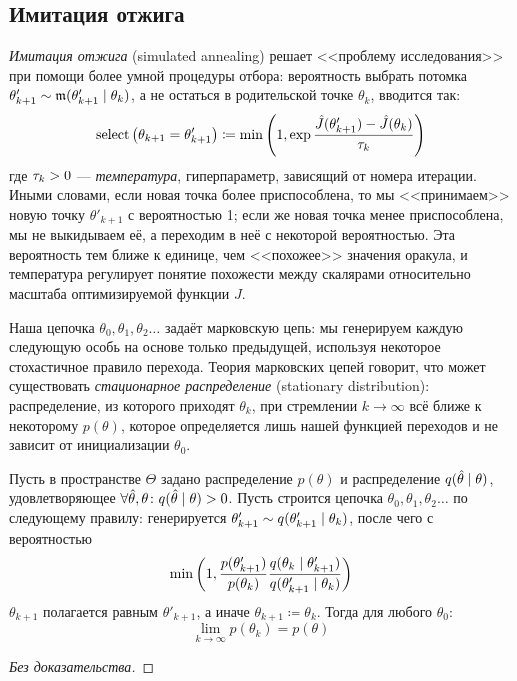 \subsection{Имитация отжига}

\emph{Имитация отжига} (simulated annealing) решает <<проблему исследования>> при помощи более умной процедуры отбора: вероятность выбрать потомка $\theta'_{k+1} \HM \sim \mut(\theta'_{k+1} \HM\mid \theta_k)$, а не остаться в родительской точке $\theta_k$, вводится так:
$$\mathrm{select} \left( \theta_{k+1} = \theta'_{k+1} \right) \coloneqq \min \left(1, \exp{\frac{\hat{J}(\theta'_{k+1}) - \hat{J}(\theta_k)}{\tau_k}} \right)$$
где $\tau_k \HM> 0$ --- \emph{температура}, гиперпараметр, зависящий от номера итерации. Иными словами, если новая точка более приспособлена, то мы <<принимаем>> новую точку $\theta'_{k+1}$ с вероятностью 1; если же новая точка менее приспособлена, мы не выкидываем её, а переходим в неё с некоторой вероятностью. Эта вероятность тем ближе к единице, чем <<похожее>> значения оракула, и температура регулирует понятие похожести между скалярами относительно масштаба оптимизируемой функции $J$.

Наша цепочка $\theta_0, \theta_1, \theta_2 \dots$ задаёт марковскую цепь: мы генерируем каждую следующую особь на основе только предыдущей, используя некоторое стохастичное правило перехода. Теория марковских цепей говорит, что может существовать \emph{стационарное распределение} (stationary distribution): распределение, из которого приходят $\theta_k$, при стремлении $k \to \infty$ всё ближе к некоторому $p(\theta)$, которое определяется лишь нашей функцией переходов и не зависит от инициализации $\theta_0$.

\begin{theorem}
Пусть в пространстве $\Theta$ задано распределение $p(\theta)$ и распределение $q(\hat{\theta} \HM\mid \theta)$, удовлетворяющее $\forall \hat{\theta}, \theta \colon q(\hat{\theta} \HM\mid \theta) > 0$. Пусть строится цепочка $\theta_0, \theta_1, \theta_2 \dots$ по следующему правилу: генерируется $\theta'_{k+1} \HM\sim q(\theta'_{k+1} \HM\mid \theta_k)$, после чего с вероятностью
$$\min \left( 1, \frac{p(\theta'_{k+1})}{p(\theta_{k})}\frac{q(\theta_k \HM\mid \theta'_{k+1})}{q(\theta'_{k+1} \HM\mid \theta_{k})} \right)$$
$\theta_{k+1}$ полагается равным $\theta'_{k+1}$, а иначе $\theta_{k+1} \coloneqq \theta_k$.
Тогда для любого $\theta_0$:
$$\lim_{k \to \infty} p(\theta_k) = p(\theta)$$
\begin{proof}[Без доказательства]
\end{proof}
\end{theorem}

